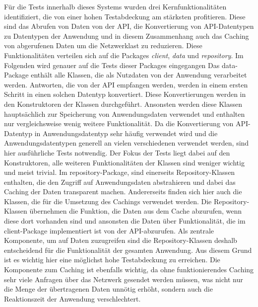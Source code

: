 \documentclass[12pt]{article}
\begin{document}
\newline
Für die Tests innerhalb dieses Systems wurden drei Kernfunktionalitäten identifiziert, die von einer hohen Testabdeckung am stärksten profitieren.
Diese sind das Abrufen von Daten von der API, die Konvertierung von API-Datentypen zu Datentypen der Anwendung und in diesem Zusammenhang auch das Caching von abgerufenen Daten um die Netzwerklast zu reduzieren.
\newline
Diese Funktionalitäten verteilen sich auf die Packages \textit{client}, \textit{data} und \textit{repository}.
Im Folgenden wird genauer auf die Tests dieser Packages eingegangen
\newline
\newline
Das data-Package enthält alle Klassen, die als Nutzdaten von der Anwendung verarbeitet werden.
Antworten, die von der API empfangen werden, werden in einem ersten Schritt in einen solchen Datentyp konvertiert.
Diese Konvertierungen werden in den Konstruktoren der Klassen durchgeführt. Ansonsten werden diese Klassen hauptsächlich zur Speicherung von Anwendungsdaten verwendet und enthalten nur vergleichsweise wenig weitere Funktionalität.
Da die Konvertierung von API-Datentyp in Anwendungsdatentyp sehr häufig verwendet wird und die Anwendungsdatentypen generell an vielen verschiedenen verwendet werden, sind hier  ausführliche Tests notwendig.
Der Fokus der Tests liegt dabei auf den Konstruktoren, alle weiteren Funktionalitäten der Klassen sind weniger wichtig und meist trivial.
\newline
\newline
Im repository-Package, sind einerseits Repository-Klassen enthalten, die den Zugriff auf Anwendungsdaten abstrahieren und dabei das Caching der Daten transparent machen.
Andererseits finden sich hier auch die Klassen, die für die Umsetzung des Cachings verwendet werden.
Die Repository-Klassen übernehmen die Funktion, die Daten aus dem Cache abzurufen, wenn diese dort vorhanden sind und ansonsten die Daten über Funktionalität, die im client-Package implementiert ist von der API-abzurufen.
Als zentrale Komponente, um auf Daten zuzugreifen sind die Repository-Klassen deshalb  entscheidend für die Funktionalität der gesamten Anwendung.
Aus diesem Grund ist es wichtig hier eine möglichst hohe Testabdeckung zu erreichen.
\newline
Die Komponente zum Caching ist ebenfalls wichtig, da ohne funktionierendes Caching sehr viele Anfragen über das Netzwerk gesendet werden müssen, was nicht nur die Menge der übertragenen Daten unnötig erhöht, sondern auch die Reaktionszeit der Anwendung verschlechtert.
\end{document}
